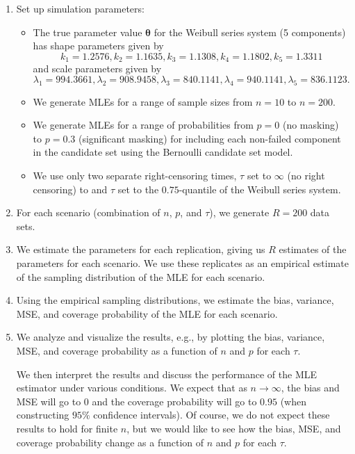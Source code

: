 \documentclass[
]{article}
\begin{document}
\begin{enumerate}
\def\labelenumi{\arabic{enumi}.}
\item
  Set up simulation parameters:

  \begin{itemize}
  \item
    The true parameter value \(\boldsymbol{\theta}\) for the Weibull
    series system (5 components) has shape parameters given by \[
      k_1 = 1.2576,
      k_2 = 1.1635,
      k_3 = 1.1308,
      k_4 = 1.1802,
      k_5 = 1.3311
     \] and scale parameters given by \[
      \lambda_1 = 994.3661,
      \lambda_2 = 908.9458,
      \lambda_3 = 840.1141,
      \lambda_4 = 940.1141,
      \lambda_5 = 836.1123.
     \]
  \item
    We generate MLEs for a range of sample sizes from \(n = 10\) to
    \(n = 200\).
  \item
    We generate MLEs for a range of probabilities from \(p = 0\) (no
    masking) to \(p = 0.3\) (significant masking) for including each
    non-failed component in the candidate set using the Bernoulli
    candidate set model.
  \item
    We use only two separate right-censoring times, \(\tau\) set to
    \(\infty\) (no right censoring) to and \(\tau\) set to the
    \(0.75\)-quantile of the Weibull series system.
  \end{itemize}
\item
  For each scenario (combination of \(n\), \(p\), and \(\tau\)), we
  generate \(R = 200\) data sets.
\item
  We estimate the parameters for each replication, giving us \(R\)
  estimates of the parameters for each scenario. We use these replicates
  as an empirical estimate of the sampling distribution of the MLE for
  each scenario.
\item
  Using the empirical sampling distributions, we estimate the bias,
  variance, MSE, and coverage probability of the MLE for each scenario.
\item
  We analyze and visualize the results, e.g., by plotting the bias,
  variance, MSE, and coverage probability as a function of \(n\) and
  \(p\) for each \(\tau\).

  We then interpret the results and discuss the performance of the MLE
  estimator under various conditions. We expect that as
  \(n \to \infty\), the bias and MSE will go to \(0\) and the coverage
  probability will go to \(0.95\) (when constructing \(95\%\) confidence
  intervals). Of course, we do not expect these results to hold for
  finite \(n\), but we would like to see how the bias, MSE, and coverage
  probability change as a function of \(n\) and \(p\) for each \(\tau\).
\end{enumerate}
\end{document}
